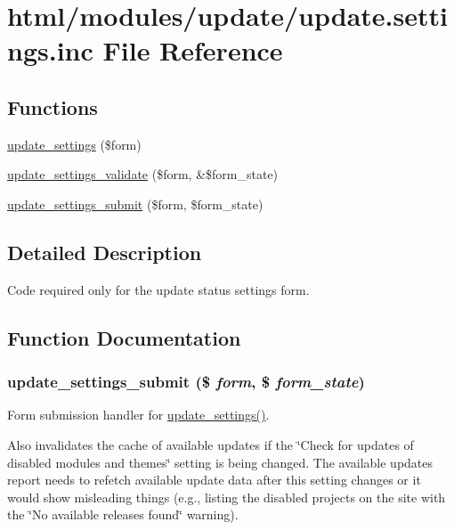 \hypertarget{update_8settings_8inc}{
\section{html/modules/update/update.settings.inc File Reference}
\label{update_8settings_8inc}
}
\subsection*{Functions}
\begin{DoxyCompactItemize}
\item 
\hyperlink{group__forms_gaef8e4ae13223ebb2175505c22c6f6fa8}{update\_\-settings} (\$form)
\item 
\hyperlink{update_8settings_8inc_a1dc52dbb9606fca692a9fb3f8127da01}{update\_\-settings\_\-validate} (\$form, \&\$form\_\-state)
\item 
\hyperlink{update_8settings_8inc_aeed026cbe23eddff17c100d629c4e3bc}{update\_\-settings\_\-submit} (\$form, \$form\_\-state)
\end{DoxyCompactItemize}


\subsection{Detailed Description}
Code required only for the update status settings form. 

\subsection{Function Documentation}
\hypertarget{update_8settings_8inc_aeed026cbe23eddff17c100d629c4e3bc}{
\subsubsection[{update\_\-settings\_\-submit}]{\setlength{\rightskip}{0pt plus 5cm}update\_\-settings\_\-submit (\$ {\em form}, \/  \$ {\em form\_\-state})}}
\label{update_8settings_8inc_aeed026cbe23eddff17c100d629c4e3bc}
Form submission handler for \hyperlink{group__forms_gaef8e4ae13223ebb2175505c22c6f6fa8}{update\_\-settings()}.

Also invalidates the cache of available updates if the \char`\"{}Check for updates of
 disabled modules and themes\char`\"{} setting is being changed. The available updates report needs to refetch available update data after this setting changes or it would show misleading things (e.g., listing the disabled projects on the site with the \char`\"{}No available releases found\char`\"{} warning).

